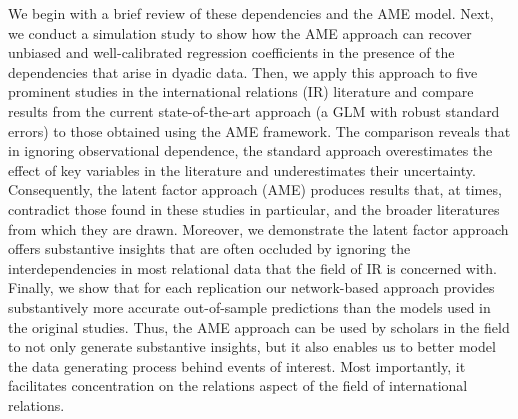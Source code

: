 We begin with a brief review of these dependencies and the AME model. Next, we conduct a simulation study to show how the AME approach can recover unbiased and well-calibrated regression coefficients in the presence of the dependencies that arise in dyadic data. Then, we apply this approach to five prominent studies in the international relations (IR) literature and compare results from the current state-of-the-art approach (a GLM with robust standard errors) to those obtained using the AME framework. The comparison reveals that in ignoring observational dependence, the standard approach overestimates the effect of key variables in the literature and underestimates their uncertainty. Consequently, the latent factor approach (AME) produces results that, at times, contradict those found in these studies in particular, and the broader literatures from which they are drawn. Moreover, we demonstrate the latent factor approach offers substantive insights that are often occluded by ignoring the interdependencies in most relational data that the field of IR is concerned with. Finally, we show that for each replication our network-based approach provides substantively more accurate out-of-sample predictions than the models used in the original studies. Thus, the AME approach can be used by scholars in the field to not only generate substantive insights, but it also enables us to better model the data generating process behind events of interest.  Most importantly, it facilitates concentration on the relations aspect of the field of international relations.